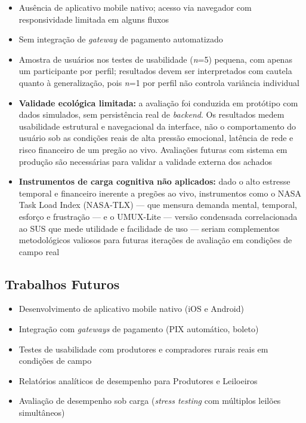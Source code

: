 \documentclass[12pt]{article}
\begin{document}
\begin{itemize}
  \item Ausência de aplicativo mobile nativo; acesso via navegador com responsividade
    limitada em alguns fluxos
  \item Sem integração de \textit{gateway} de pagamento automatizado
  \item Amostra de usuários nos testes de usabilidade (\textit{n}=5) pequena, com apenas
    um participante por perfil; resultados devem ser interpretados com cautela quanto à
    generalização, pois \textit{n}=1 por perfil não controla variância individual
  \item \textbf{Validade ecológica limitada:} a avaliação foi conduzida em protótipo com
    dados simulados, sem persistência real de \textit{backend}. Os resultados medem
    usabilidade estrutural e navegacional da interface, não o comportamento do usuário sob
    as condições reais de alta pressão emocional, latência de rede e risco financeiro de
    um pregão ao vivo. Avaliações futuras com sistema em produção são necessárias para
    validar a validade externa dos achados
  \item \textbf{Instrumentos de carga cognitiva não aplicados:} dado o alto estresse
    temporal e financeiro inerente a pregões ao vivo, instrumentos como o NASA Task Load
    Index (NASA-TLX) --- que mensura demanda mental, temporal, esforço e frustração --- e
    o UMUX-Lite --- versão condensada correlacionada ao SUS que mede utilidade e
    facilidade de uso --- seriam complementos metodológicos valiosos para futuras
    iterações de avaliação em condições de campo real
\end{itemize}

\subsection{Trabalhos Futuros}

\begin{itemize}
  \item Desenvolvimento de aplicativo mobile nativo (iOS e Android)
  \item Integração com \textit{gateways} de pagamento (PIX automático, boleto)
  \item Testes de usabilidade com produtores e compradores rurais reais em condições de
    campo
  \item Relatórios analíticos de desempenho para Produtores e Leiloeiros
  \item Avaliação de desempenho sob carga (\textit{stress testing} com múltiplos
    leilões simultâneos)
\end{itemize}
\end{document}

